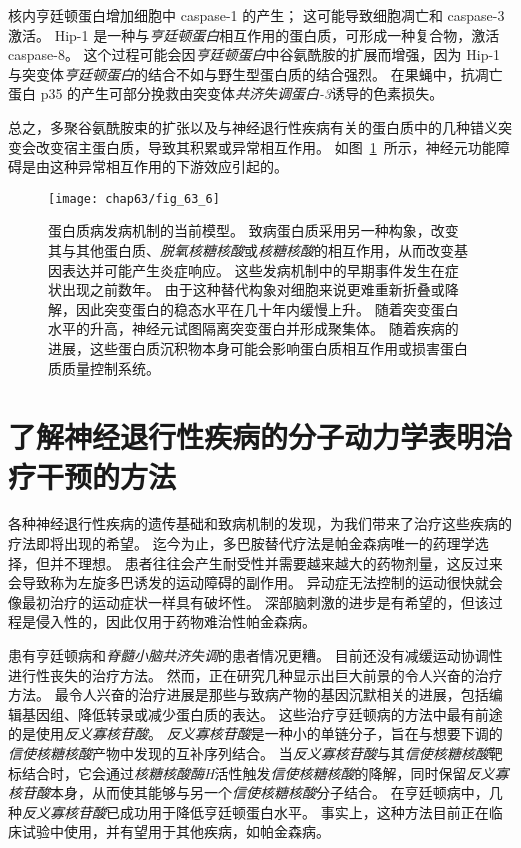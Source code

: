核内亨廷顿蛋白增加细胞中 caspase-1 的产生；
这可能导致细胞凋亡和 caspase-3 激活。
Hip-1 是一种与\textit{亨廷顿蛋白}相互作用的蛋白质，可形成一种复合物，激活 caspase-8。
这个过程可能会因\textit{亨廷顿蛋白}中谷氨酰胺的扩展而增强，因为 Hip-1 与突变体\textit{亨廷顿蛋白}的结合不如与野生型蛋白质的结合强烈。
在果蝇中，抗凋亡蛋白 p35 的产生可部分挽救由突变体\textit{共济失调蛋白-3}诱导的色素损失。


总之，多聚谷氨酰胺束的扩张以及与神经退行性疾病有关的蛋白质中的几种错义突变会改变宿主蛋白质，导致其积累或异常相互作用。
如图~\ref{fig:63_6}~所示，神经元功能障碍是由这种异常相互作用的下游效应引起的。


\begin{figure}[htbp]
	\centering
	\texttt{[image: chap63/fig\_63\_6]}
	\caption{蛋白质病发病机制的当前模型。
		致病蛋白质采用另一种构象，改变其与其他蛋白质、\textit{脱氧核糖核酸}或\textit{核糖核酸}的相互作用，从而改变基因表达并可能产生炎症响应。
		这些发病机制中的早期事件发生在症状出现之前数年。
		由于这种替代构象对细胞来说更难重新折叠或降解，因此突变蛋白的稳态水平在几十年内缓慢上升。
		随着突变蛋白水平的升高，神经元试图隔离突变蛋白并形成聚集体。
		随着疾病的进展，这些蛋白质沉积物本身可能会影响蛋白质相互作用或损害蛋白质质量控制系统。}
	\label{fig:63_6}
\end{figure}



\section{了解神经退行性疾病的分子动力学表明治疗干预的方法}

各种神经退行性疾病的遗传基础和致病机制的发现，为我们带来了治疗这些疾病的疗法即将出现的希望。
迄今为止，多巴胺替代疗法是帕金森病唯一的药理学选择，但并不理想。
患者往往会产生耐受性并需要越来越大的药物剂量，这反过来会导致称为左旋多巴诱发的运动障碍的副作用。
异动症无法控制的运动很快就会像最初治疗的运动症状一样具有破坏性。
深部脑刺激的进步是有希望的，但该过程是侵入性的，因此仅用于药物难治性帕金森病。


患有亨廷顿病和\textit{脊髓小脑共济失调}的患者情况更糟。
目前还没有减缓运动协调性进行性丧失的治疗方法。
然而，正在研究几种显示出巨大前景的令人兴奋的治疗方法。
最令人兴奋的治疗进展是那些与致病产物的基因沉默相关的进展，包括编辑基因组、降低转录或减少蛋白质的表达。
这些治疗亨廷顿病的方法中最有前途的是使用\textit{反义寡核苷酸}。
\textit{反义寡核苷酸}是一种小的单链分子，旨在与想要下调的\textit{信使核糖核酸}产物中发现的互补序列结合。
当\textit{反义寡核苷酸}与其\textit{信使核糖核酸}靶标结合时，它会通过\textit{核糖核酸酶H}活性触发\textit{信使核糖核酸}的降解，同时保留\textit{反义寡核苷酸}本身，从而使其能够与另一个\textit{信使核糖核酸}分子结合。
在亨廷顿病中，几种\textit{反义寡核苷酸}已成功用于降低亨廷顿蛋白水平。
事实上，这种方法目前正在临床试验中使用，并有望用于其他疾病，如帕金森病。


